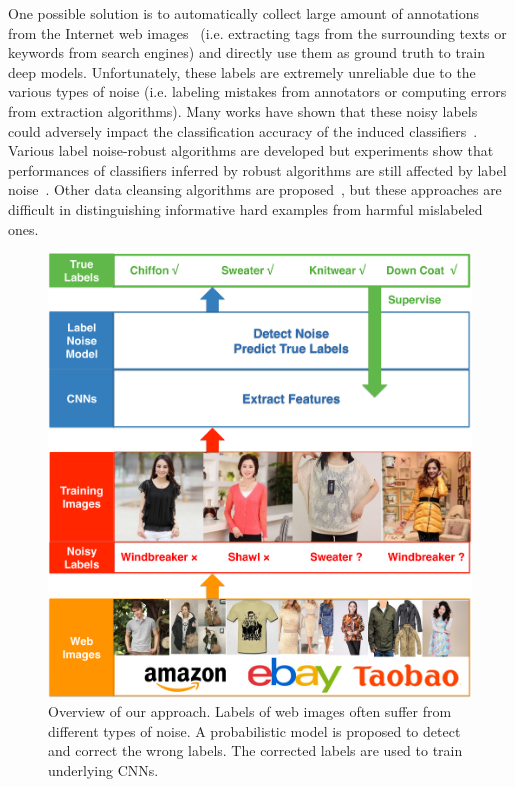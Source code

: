 \documentclass[10pt,twocolumn,letterpaper]{article}
\begin{document}
One possible solution is to automatically collect large amount of annotations from the Internet web images~\cite{gong2014multiview} (i.e. extracting tags from the surrounding texts or keywords from search engines) and directly use them as ground truth to train deep models. Unfortunately, these labels are extremely unreliable due to the various types of noise (i.e. labeling mistakes from annotators or computing errors from extraction algorithms). Many works have shown that these noisy labels could adversely impact the classification accuracy of the induced classifiers~\cite{zhu2004class,nettleton2010study,pechenizkiy2006class}. Various label noise-robust algorithms are developed but experiments show that performances of classifiers inferred by robust algorithms are still affected by label noise~\cite{bartlett2006convexity,teng2001comparison}. Other data cleansing algorithms are proposed~\cite{barandela2000decontamination,brodley2011identifying,miranda2009use}, but these approaches are difficult in distinguishing informative hard examples from harmful mislabeled ones.

\begin{figure}[t]
\begin{center}
\includegraphics[width=0.9\linewidth]{figure/overview.pdf}
\end{center}
\caption{Overview of our approach. Labels of web images often suffer from different types of noise. A probabilistic model is proposed to detect and correct the wrong labels. The corrected labels are used to train underlying CNNs.}
\label{fig:overview}
\end{figure}
\end{document}
